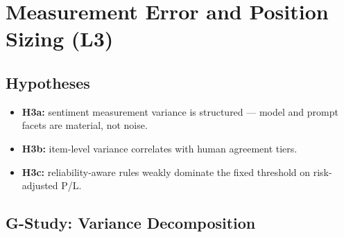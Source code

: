 %
%
%
\chapter{Measurement Error and Position Sizing (L3)}
\label{ch:layer3}

\section{Hypotheses}
\label{sec:l3-hypotheses}

\begin{itemize}
  \item \textbf{H3a:} sentiment measurement variance is structured ---
        model and prompt facets are material, not noise.
  \item \textbf{H3b:} item-level variance correlates with human
        agreement tiers.
  \item \textbf{H3c:} reliability-aware rules weakly dominate the
        fixed threshold on risk-adjusted P/L.
\end{itemize}

\section{G-Study: Variance Decomposition}
\label{sec:l3-gstudy}


